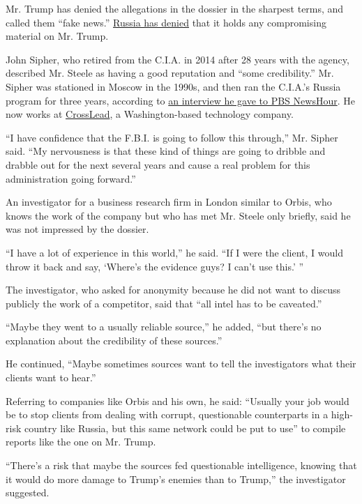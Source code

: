 Mr. Trump has denied the allegations in the dossier in the sharpest
terms, and called them ``fake news.''
\href{https://www.nytimes.com/2016/09/22/world/europe/russia-syria-aid-convoy.html}{Russia
has denied} that it holds any compromising material on Mr. Trump.

John Sipher, who retired from the C.I.A. in 2014 after 28 years with the
agency, described Mr. Steele as having a good reputation and ``some
credibility.'' Mr. Sipher was stationed in Moscow in the 1990s, and then
ran the C.I.A.'s Russia program for three years, according to
\href{http://www.pbs.org/newshour/bb/credible-reports-alleged-russian-dossier-trump/}{an
interview he gave to PBS NewsHour}. He now works at
\href{https://www.crosslead.com/our-team/}{CrossLead}, a
Washington-based technology company.

``I have confidence that the F.B.I. is going to follow this through,''
Mr. Sipher said. ``My nervousness is that these kind of things are going
to dribble and drabble out for the next several years and cause a real
problem for this administration going forward.''

An investigator for a business research firm in London similar to Orbis,
who knows the work of the company but who has met Mr. Steele only
briefly, said he was not impressed by the dossier.

``I have a lot of experience in this world,'' he said. ``If I were the
client, I would throw it back and say, `Where's the evidence guys? I
can't use this.' ''

The investigator, who asked for anonymity because he did not want to
discuss publicly the work of a competitor, said that ``all intel has to
be caveated.''

``Maybe they went to a usually reliable source,'' he added, ``but
there's no explanation about the credibility of these sources.''

He continued, ``Maybe sometimes sources want to tell the investigators
what their clients want to hear.''

Referring to companies like Orbis and his own, he said: ``Usually your
job would be to stop clients from dealing with corrupt, questionable
counterparts in a high-risk country like Russia, but this same network
could be put to use'' to compile reports like the one on Mr. Trump.

``There's a risk that maybe the sources fed questionable intelligence,
knowing that it would do more damage to Trump's enemies than to Trump,''
the investigator suggested.

